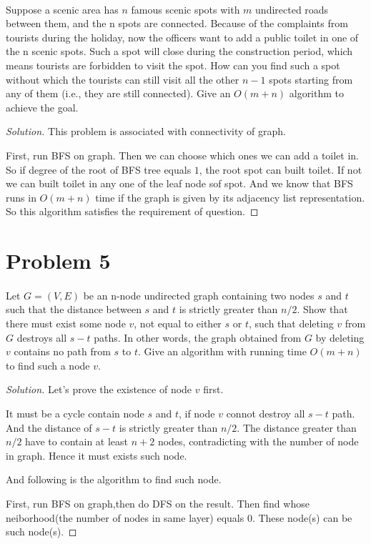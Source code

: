 \documentclass[a4paper]{article}
\newenvironment{solution}
  {\renewcommand\qedsymbol{$\blacksquare$}\begin{proof}[Solution]}
  {\end{proof}}
\begin{document}
\paragraph{}
Suppose a scenic area has $n$ famous scenic spots with $m$ undirected roads between them, and the n
spots are connected. Because of the complaints from tourists during the holiday, now the officers want to
add a public toilet in one of the n scenic spots. Such a spot will close during the construction period, which
means tourists are forbidden to visit the spot. How can you find such a spot without which the tourists can
still visit all the other $n − 1$ spots starting from any of them (i.e., they are still connected). Give an $O(m + n)$
algorithm to achieve the goal.
\begin{solution}
  This problem is associated with connectivity of graph.

  First, run BFS on graph. Then we can choose which ones we can add a toilet
  in. So if degree of the root of BFS tree equals $1$, the root spot can built toilet. If not
  we can built toilet in any one of the leaf node sof spot. And we know that BFS
   runs in $O(m + n)$ time if the graph is given by its adjacency list representation.
  So this algorithm satisfies the requirement of question.
\end{solution}

\section*{Problem 5}
\paragraph{}
Let $G = (V, E)$ be an n-node undirected graph containing two nodes $s$ and $t$ such that the distance
between $s$ and $t$ is strictly greater than $n/2$. Show that there must exist some node $v$, not equal to either
$s$ or $t$, such that deleting $v$ from $G$ destroys all $s-t$ paths. In other words, the graph obtained from $G$ by
deleting $v$ contains no path from $s$ to $t$. Give an algorithm with running time $O(m + n)$ to find such a node
$v$.
\begin{solution}
  Let's prove the existence of node $v$ first.

  It must be a cycle contain node $s$ and $t$, if node $v$ connot destroy all
  $s-t$ path. And the distance of $s-t$ is strictly greater than $n/2$. The distance greater than
  $n/2$ have to contain at least $n+2$ nodes, contradicting with the number of node in graph. Hence
  it must exists such node.

  And following is the algorithm to find such node.

  First, run BFS on graph,then do DFS on the result. Then find whose neiborhood(the number of nodes in same layer) equals $0$.
  These node(s) can be such node(s).
\end{solution}
\end{document}
